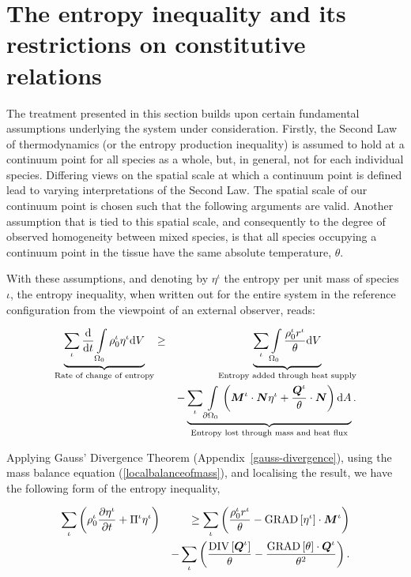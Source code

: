 \section{The entropy inequality and its restrictions on constitutive
  relations}
\label{entropy-inequality}

The treatment presented in this section builds upon certain
fundamental assumptions underlying the system under
consideration. Firstly, the Second Law of thermodynamics (or the
entropy production inequality) is assumed to hold at a continuum point
for all species as a whole, but, in general, not for each individual
species. Differing views on the spatial scale at which a continuum
point is defined lead to varying interpretations of the Second
Law. The spatial scale of our continuum point is chosen such that the
following arguments are valid. Another assumption that is tied to this
spatial scale, and consequently to the degree of observed homogeneity
between mixed species, is that all species occupying a continuum point
in the tissue have the same absolute temperature, $\theta$.

With these assumptions, and denoting by $\eta^\iota$ the entropy per
unit mass of species~$\iota$, the entropy inequality, when written out
for the entire system in the reference configuration from the
viewpoint of an external observer, reads:

\begin{eqnarray}
\underbrace{\sum\limits_{\iota}\frac{\mathrm{d}}{\mathrm{d}t}
  \int\limits_{\Omega_0} \rho_0^\iota \eta^\iota
  \mathrm{d}V}_{\text{Rate of change of entropy}} &\geq&
\underbrace{\sum\limits_{\iota}\int\limits_{\Omega_0}
  \frac{\rho_0^\iota r^\iota}{\theta}
  \mathrm{d}V}_{\text{Entropy added through heat supply}}\nonumber\\ &
&- \underbrace{\sum\limits_{\iota}\int\limits_{\partial \Omega_0}
  \left(\mbox{\boldmath$ M$}^\iota \cdot \mbox{\boldmath$ N$}\eta^\iota + \frac{\mbox{\boldmath$ Q$}^\iota}{\theta} \cdot
  \mbox{\boldmath$ N$} \right)\mathrm{d}A}_{\text{Entropy lost through mass and heat
    flux}}.
\label{globalentropyinequality}
\end{eqnarray}

\noindent Applying Gauss' Divergence Theorem
(Appendix~\ref{gauss-divergence}), using the mass balance equation
(\ref{localbalanceofmass}), and localising the result, we have the
following form of the entropy inequality,

\begin{eqnarray}
\sum\limits_{\iota}\left(\rho_0^\iota\frac{\partial\eta^\iota}{\partial
  t} + \Pi^{\iota}\eta^{\iota}
\right) & & \geq
\sum\limits_{\iota}\left(\frac{\rho_0^\iota 
r^\iota}{\theta} -\mathrm{GRAD}\left[\eta^\iota\right]\cdot\mbox{\boldmath$ M$}^\iota
\right) \nonumber \\ & & - \sum\limits_{\iota}\left(
\frac{\mathrm{DIV}\left[\mbox{\boldmath$ Q$}^\iota\right]}{\theta} -
\frac{\mathrm{GRAD}\left[\theta\right]\cdot\mbox{\boldmath$ Q$}^\iota}{\theta^2}\right).
\label{localentropyinequality}
\end{eqnarray}

